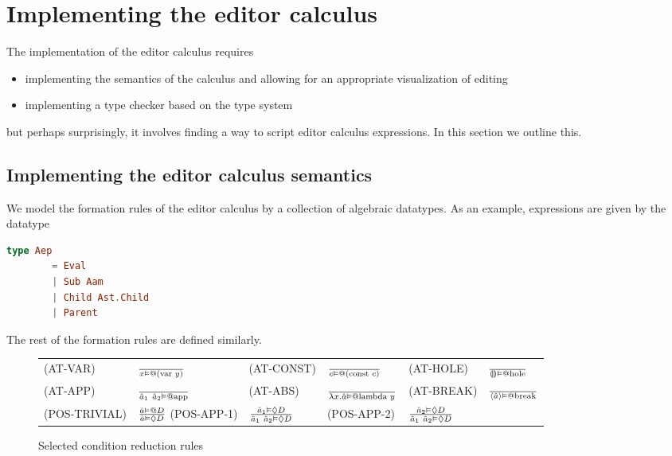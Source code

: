 \section{Implementing the editor calculus}

The implementation of the editor calculus requires

\begin{itemize}
  \item implementing the semantics of the calculus and allowing for an
        appropriate visualization of editing
  \item implementing a type checker based on the type system
\end{itemize}

but perhaps surprisingly, it involves finding a way to script editor
calculus expressions. In this section we outline this.

\subsection{Implementing the editor calculus semantics}

We model the formation rules of the editor calculus by a collection of
algebraic datatypes. As an example, expressions are given by the
datatype

\begin{lstlisting}[language=elm,%
                   label={aep-without-holes-definition},%
                   gobble=4,%
                   caption={Formation rules (\ref{aep-formation-rules}) modeled in Elm},%
                   ]
    type Aep
        = Eval
        | Sub Aam
        | Child Ast.Child
        | Parent
\end{lstlisting}
The rest of the formation rules are defined similarly.


\begin{figure}
  \center
  \renewcommand{\arraystretch}{2}
  \begin{tabular}{llllll}
    \scriptsize(AT-VAR)      & $\frac{} {x \vDash @(\text{var }y)}$      & \scriptsize(AT-CONST)  & $\frac{} {c \vDash @(\text{const }c)}$   & \scriptsize(AT-HOLE)  & $\frac{} {\llparenthesis\rrparenthesis \vDash @\text{hole}}$  \\
    \scriptsize(AT-APP)      & $\frac{} {\hat{a}_1~\hat{a}_2 \vDash @\text{app}}$      & \scriptsize(AT-ABS)    & $\frac{} {\lambda x.\hat{a} \vDash @\text{lambda }y}$     & \scriptsize(AT-BREAK) & $\frac{} {\langle \hat{a} \rangle \vDash @\text{break}}$ \\
    \scriptsize(POS-TRIVIAL) & $\frac{\hat{a} \vDash @D} {\hat{a} \vDash \Diamond D}$                                                                              %
    \scriptsize(POS-APP-1)   & $\frac{\hat{a}_1 \vDash \Diamond D} {\hat{a}_1~\hat{a}_2 \vDash \Diamond D}$  & \scriptsize(POS-APP-2) & $\frac{\hat{a}_2 \vDash \Diamond D} {\hat{a}_1~\hat{a}_2 \vDash \Diamond D}$                                      %
  \end{tabular}
  \caption{Selected condition reduction rules}
  \label{fig:conditionreductionrules}
\end{figure}


